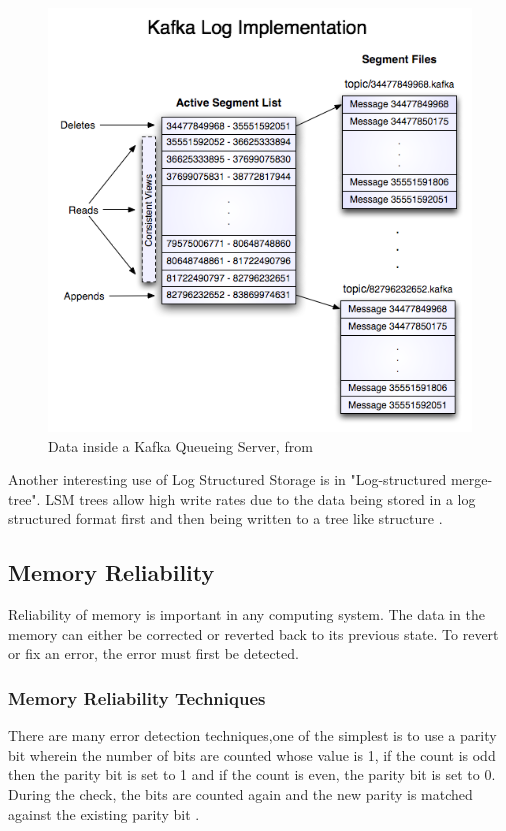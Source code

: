 \documentclass[12pt,a4paper]{article}
\begin{document}
 \begin{figure}
 	\centering
 	\textbf{}\par\medskip
 	\includegraphics[scale=0.5]{5}
 	\caption{Data inside a Kafka Queueing Server, from \citep{kreps2011kafka}}
 	\label{fig:gdull05}
 \end{figure}



Another interesting use of Log Structured Storage is in "Log-structured merge-tree". LSM trees allow high write rates due to the data being stored in a log structured format first and then being written to a tree like structure \citep{o1996log}.

\subsection{Memory Reliability }

Reliability of memory is important in any computing system. The data in the memory can either be corrected or reverted back to its previous state. To revert or fix an error, the error must first be detected.

\subsubsection{Memory Reliability Techniques}
	There are many error detection techniques,one of the simplest is to use a parity bit wherein the number of bits are counted whose value is 1, if the count is odd then the parity bit is set to 1 and if the count is even, the parity bit is set to 0. During the check, the bits are counted again and the new parity is matched against the existing parity bit \citep{b1x}.\\
	
\end{document}

